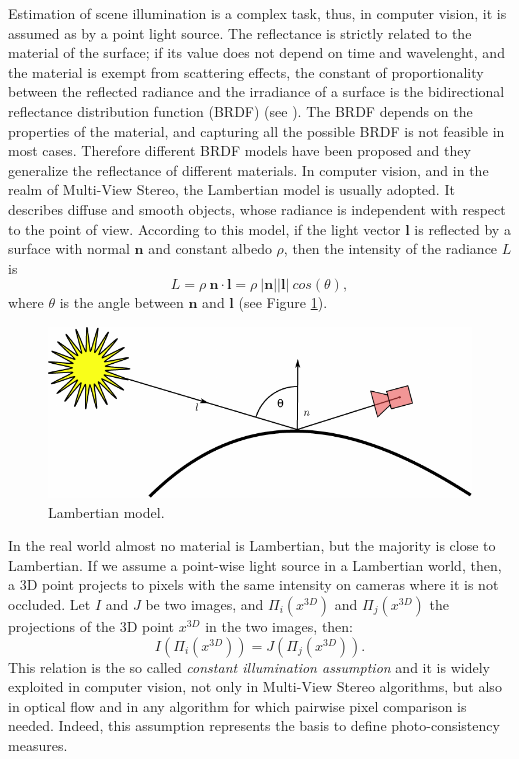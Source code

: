 Estimation of scene illumination is a complex task, thus, in computer vision, it is assumed as by a point light source.
The reflectance  is strictly related to the material of the surface;  if its value does not depend on time and wavelenght, and the material is exempt from scattering effects, the constant of proportionality between the reflected radiance and the irradiance of a surface is the bidirectional reflectance distribution function (BRDF) (see \cite{cohen2012radiosity}). 
The BRDF depends on the properties of the material, and capturing all the possible BRDF is not feasible in most cases. 
Therefore different BRDF models have been proposed and they generalize the reflectance of different materials. 
In computer vision, and in the realm of Multi-View Stereo, the Lambertian model is usually adopted. It describes diffuse and smooth objects, whose radiance is independent with respect to the point of view. 
According to this model, if the light vector $\mathbf{l}$ is reflected by a surface with normal $\mathbf{n}$ and  constant albedo $\rho$, then the intensity of the radiance $L$ is 
\begin{equation}
  L = \rho \: \mathbf{n} \cdot \mathbf{l} = \rho \: |\mathbf{n}|  |\mathbf{l}| \: cos(\theta),
\end{equation}
where $\theta$ is the angle between $\mathbf{n}$ and $\mathbf{l}$ (see Figure \ref{fig:lamber}).

\begin{figure}[t]
\includegraphics[width=0.99\columnwidth]{./img/ch_soa/lambert}
 \caption{Lambertian model.} 
\label{fig:lamber}
\end{figure}

In the real world almost no material is Lambertian, but the majority is close to Lambertian.
If we assume a point-wise light source in a Lambertian world, then, a 3D point projects to pixels with the same intensity on cameras where it is not occluded. 
Let $I$ and $J$ be two images, and $\Pi_i(x^{3D})$ and  $\Pi_j(x^{3D})$ the projections of the 3D point $x^{3D}$ in the two images, then:
\begin{equation}
 \label{eq:const_bright} 
 I(\Pi_i(x^{3D})) = J(\Pi_j(x^{3D})).
\end{equation}
This relation is the so called \emph{constant illumination assumption} and it is widely exploited in computer vision, not only in Multi-View Stereo algorithms, but also in optical flow and in  any algorithm for which pairwise pixel comparison is needed.
Indeed, this assumption represents the basis to define photo-consistency measures.


